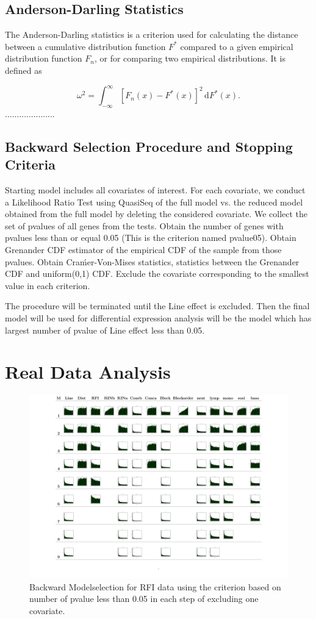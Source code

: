 \documentclass[12pt, letter]{article}\usepackage[]{graphicx}\usepackage[]{color}
\begin{document}
\subsection{\bf Anderson-Darling Statistics}
The Anderson-Darling  statistics is a criterion used for calculating the distance between  a cumulative distribution function $F^*$ compared to a given empirical distribution function $F_n$, or for comparing two empirical distributions. It is defined as

\[
\omega^2 = \int_{-\infty}^{\infty} [F_n(x)-F^*(x)]^2\,\mathrm{d}F^*(x) .
\]
.....................
\subsection{Backward Selection Procedure and Stopping Criteria}

Starting model includes all covariates of interest. For each covariate,
we conduct a Likelihood Ratio Test using QuasiSeq of the full model
vs. the reduced model obtained from the full model by deleting the
considered covariate. We collect the set of pvalues of all genes from
the tests.
Obtain the number of genes with pvalues less than or equal 0.05 (This is the criterion named pvalue05).
Obtain Grenander CDF estimator of the empirical CDF of the sample
from those pvalues.
Obtain Craḿer-Von-Mises statistics,
 statistics between the Grenander CDF and
uniform(0,1) CDF.
Exclude the covariate corresponding to the smallest value in each criterion.

The procedure will be terminated until the Line effect is excluded.  Then the final model will be used for differential expression analysis will be the model which has largest number of pvalue of Line effect less than 0.05.
\section{\bf Real Data Analysis}
\begin{figure}[h!]
\centering
\includegraphics[scale = 0.27]{PlotG9P2PairedEndCBCpvalue05.pdf}
\caption{Backward Modelselection for RFI data using the criterion based on number of pvalue less than 0.05 in each step of excluding one covariate. }
\end{figure}
\end{document}
